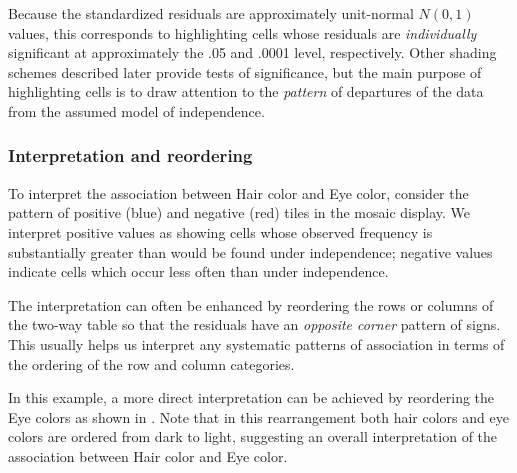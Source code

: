 \documentclass[11pt]{book}\usepackage[]{graphicx}\usepackage[]{color}
\begin{document}
Because the standardized residuals are approximately unit-normal $N(0,1)$
values,  this corresponds to highlighting cells whose
residuals are \emph{individually} significant at approximately
the .05 and .0001 level, respectively.
Other shading schemes described later provide tests of significance,
but the main purpose  of highlighting cells is to draw attention to the \emph{pattern}
of departures of the data from the assumed model of independence.

\subsubsection{Interpretation and reordering}

To interpret the association between Hair color and Eye color,
consider the pattern of positive (blue) and negative (red)
tiles in the mosaic display.  
We interpret positive values as showing cells whose observed frequency
is substantially greater than would be found under independence;
negative values indicate cells which occur less often than
under independence.

The interpretation can often be enhanced by reordering the rows or columns
of the two-way table so that the residuals have an \emph{opposite
corner} pattern of signs.  This usually helps us interpret any systematic
patterns of association in terms of the ordering of the row and column
categories.

In this example, a more direct interpretation can be achieved by
reordering the Eye colors as shown in
. 
Note that in this rearrangement
both hair colors and eye colors are ordered from dark to light,
suggesting an overall interpretation of the association
between Hair color and Eye color.
\end{document}

